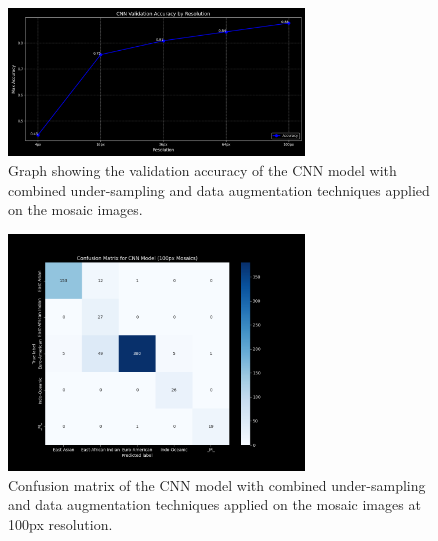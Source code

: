 \begin{appendices}
	\begin{figure}[htbp!]
		\centering
		\includegraphics[width=0.7\textwidth]{../imgs/graphs/kfold-undersample/cnn_validation_accuracy_kfold_mosaics_line_mask_5_aug-under.png}
		\caption{Graph showing the validation accuracy of the CNN model with combined under-sampling and data augmentation
			techniques applied on the mosaic images.}
		\label{fig:combined_techniques_accuracy_mosaic}
	\end{figure}

	\begin{figure}[htbp!]
		\centering
		\includegraphics[width=0.7\textwidth]{../imgs/graphs/kfold-undersample/cnn_confusion_matrix_kfold_mosaics_100px_mask_5_aug-under.png}
		\caption{Confusion matrix of the CNN model with combined under-sampling and data augmentation techniques
			applied on the mosaic images at 100px resolution.}
		\label{fig:combined_techniques_confusion_matrix_mosaic}
	\end{figure}

\end{appendices}